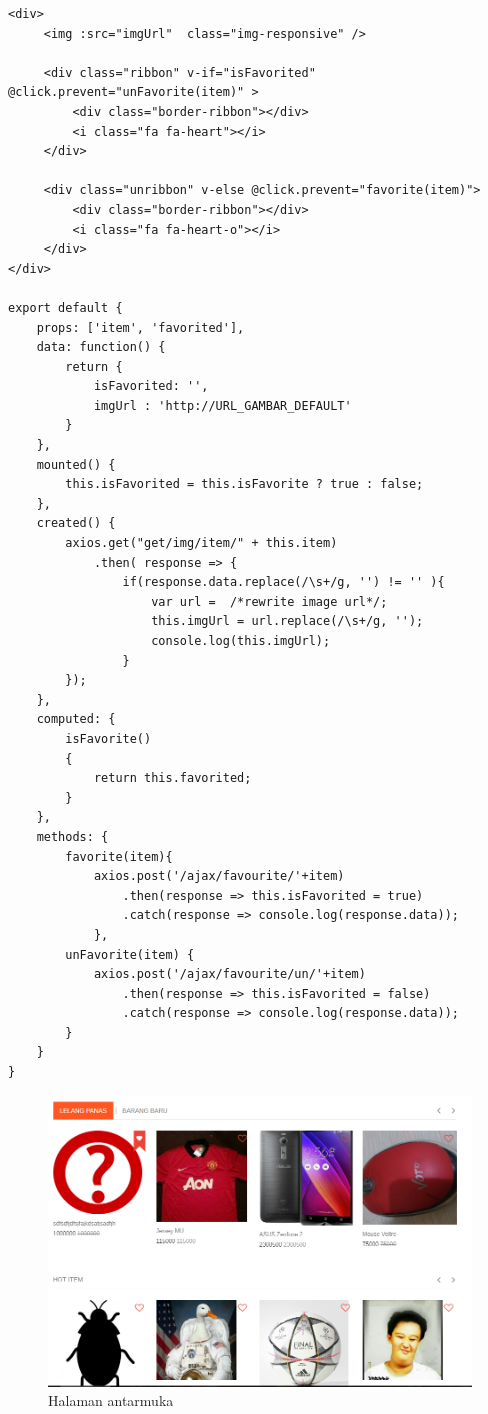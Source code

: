 \begin{lstlisting}[label=cdve.02-01,style=htmlcssjs,caption=Kode Sumber Vue Melihat Daftar Barang]
<div>
	 <img :src="imgUrl"  class="img-responsive" />
	 
	 <div class="ribbon" v-if="isFavorited" @click.prevent="unFavorite(item)" >
		 <div class="border-ribbon"></div>
		 <i class="fa fa-heart"></i>
	 </div>
	 
	 <div class="unribbon" v-else @click.prevent="favorite(item)">
		 <div class="border-ribbon"></div>
		 <i class="fa fa-heart-o"></i>
	 </div>
</div>

export default {
    props: ['item', 'favorited'],
    data: function() {
        return {
            isFavorited: '',
            imgUrl : 'http://URL_GAMBAR_DEFAULT'
        }
    },
    mounted() {
        this.isFavorited = this.isFavorite ? true : false;
    },
    created() {
        axios.get("get/img/item/" + this.item)
            .then( response => {
	            if(response.data.replace(/\s+/g, '') != '' ){
	            	var url =  /*rewrite image url*/;
	            	this.imgUrl = url.replace(/\s+/g, '');
	            	console.log(this.imgUrl);
	        	}
    	});
    },
    computed: {
        isFavorite()
        {
            return this.favorited;
        }
    },
    methods: {
        favorite(item){
            axios.post('/ajax/favourite/'+item)
                .then(response => this.isFavorited = true)
        		.catch(response => console.log(response.data));
        	},
        unFavorite(item) {
            axios.post('/ajax/favourite/un/'+item)
                .then(response => this.isFavorited = false)
        		.catch(response => console.log(response.data));
        }
    }
}
\end{lstlisting}

\begin{figure}[H]
	\centering
	\includegraphics[width=\textwidth]{images/bab4/ui/02-01.png}
	\caption{Halaman antarmuka }
	\label{ui.02-01}
\end{figure}

